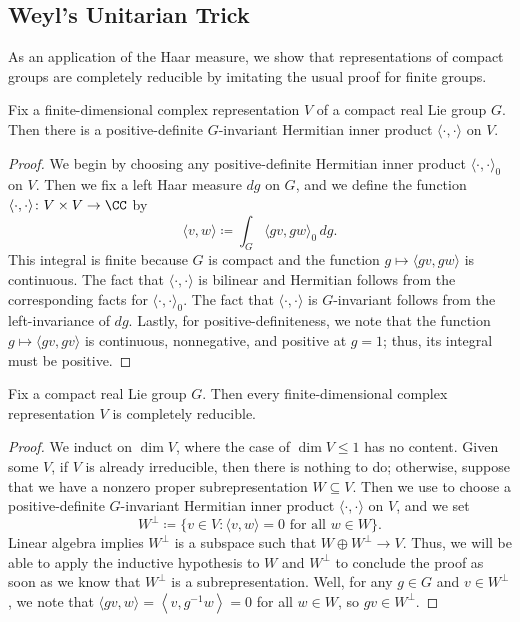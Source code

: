 \documentclass[notes.tex]{subfiles}
\begin{document}
\subsection{Weyl's Unitarian Trick}
As an application of the Haar measure, we show that representations of compact groups are completely reducible by imitating the usual proof for finite groups.
\begin{proposition} \label{prop:weyl-unitary}
	Fix a finite-dimensional complex representation $V$ of a compact real Lie group $G$. Then there is a positive-definite $G$-invariant Hermitian inner product $\langle\cdot,\cdot\rangle$ on $V$.
\end{proposition}
\begin{proof}
	We begin by choosing any positive-definite Hermitian inner product $\langle\cdot,\cdot\rangle_0$ on $V$. Then we fix a left Haar measure $dg$ on $G$, and we define the function $\langle\cdot,\cdot\rangle\colon V\times V\to\CC$ by
	\[\langle v,w\rangle\coloneqq\int_G\langle gv,gw\rangle_0\,dg.\]
	This integral is finite because $G$ is compact and the function $g\mapsto\langle gv,gw\rangle$ is continuous. The fact that $\langle\cdot,\cdot\rangle$ is bilinear and Hermitian follows from the corresponding facts for $\langle\cdot,\cdot\rangle_0$. The fact that $\langle\cdot,\cdot\rangle$ is $G$-invariant follows from the left-invariance of $dg$. Lastly, for positive-definiteness, we note that the function $g\mapsto\langle gv,gv\rangle$ is continuous, nonnegative, and positive at $g=1$; thus, its integral must be positive.
\end{proof}
\begin{corollary} \label{cor:compact-semisimple}
	Fix a compact real Lie group $G$. Then every finite-dimensional complex representation $V$ is completely reducible.
\end{corollary}
\begin{proof}
	We induct on $\dim V$, where the case of $\dim V\le1$ has no content. Given some $V$, if $V$ is already irreducible, then there is nothing to do; otherwise, suppose that we have a nonzero proper subrepresentation $W\subseteq V$. Then we use  to choose a positive-definite $G$-invariant Hermitian inner product $\langle\cdot,\cdot\rangle$ on $V$, and we set
	\[W^\perp\coloneqq\{v\in V:\langle v,w\rangle=0\text{ for all }w\in W\}.\]
	Linear algebra implies $W^\perp$ is a subspace such that $W\oplus W^\perp\to V$. Thus, we will be able to apply the inductive hypothesis to $W$ and $W^\perp$ to conclude the proof as soon as we know that $W^\perp$ is a subrepresentation. Well, for any $g\in G$ and $v\in W^\perp$, we note that $\langle gv,w\rangle=\left\langle v,g^{-1}w\right\rangle=0$ for all $w\in W$, so $gv\in W^\perp$.
\end{proof}
\end{document}
